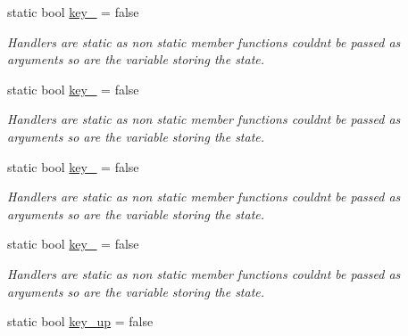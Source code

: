 \begin{DoxyCompactItemize}
\item 
static bool \hyperlink{classcft_1_1Scene_a42dcab7914b95a4f1f002631807e6baf}{key\+\_} = false\hypertarget{classcft_1_1Scene_a42dcab7914b95a4f1f002631807e6baf}{}\label{classcft_1_1Scene_a42dcab7914b95a4f1f002631807e6baf}

\begin{DoxyCompactList}\small\item\em Handlers are static as non static member functions couldn\textquotesingle{}t be passed as arguments so are the variable storing the state. \end{DoxyCompactList}\item 
static bool \hyperlink{classcft_1_1Scene_a786f419b953bf60cb0b4ef4d203a00c7}{key\+\_} = false\hypertarget{classcft_1_1Scene_a786f419b953bf60cb0b4ef4d203a00c7}{}\label{classcft_1_1Scene_a786f419b953bf60cb0b4ef4d203a00c7}

\begin{DoxyCompactList}\small\item\em Handlers are static as non static member functions couldn\textquotesingle{}t be passed as arguments so are the variable storing the state. \end{DoxyCompactList}\item 
static bool \hyperlink{classcft_1_1Scene_afb772442443b491e3ca00f46b6e66e0e}{key\+\_} = false\hypertarget{classcft_1_1Scene_afb772442443b491e3ca00f46b6e66e0e}{}\label{classcft_1_1Scene_afb772442443b491e3ca00f46b6e66e0e}

\begin{DoxyCompactList}\small\item\em Handlers are static as non static member functions couldn\textquotesingle{}t be passed as arguments so are the variable storing the state. \end{DoxyCompactList}\item 
static bool \hyperlink{classcft_1_1Scene_a7def3af5a0ab56cddd4c2f2bbc02142c}{key\+\_} = false\hypertarget{classcft_1_1Scene_a7def3af5a0ab56cddd4c2f2bbc02142c}{}\label{classcft_1_1Scene_a7def3af5a0ab56cddd4c2f2bbc02142c}

\begin{DoxyCompactList}\small\item\em Handlers are static as non static member functions couldn\textquotesingle{}t be passed as arguments so are the variable storing the state. \end{DoxyCompactList}\item 
static bool \hyperlink{classcft_1_1Scene_a176db973bb87a960fb84b92a3c81da84}{key\+\_\+up} = false\hypertarget{classcft_1_1Scene_a176db973bb87a960fb84b92a3c81da84}{}\label{classcft_1_1Scene_a176db973bb87a960fb84b92a3c81da84}


\end{DoxyCompactItemize}
